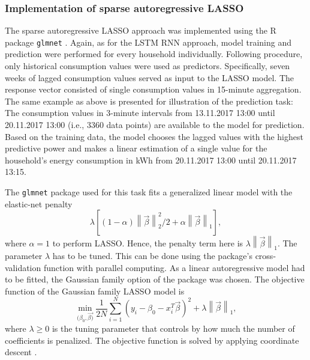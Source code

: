 \subsubsection{Implementation of sparse autoregressive LASSO}

The sparse autoregressive LASSO approach was implemented using the R package \texttt{glmnet} \citep{Friedman:2010}. Again, as for the LSTM RNN approach, model training and prediction were performed for every household individually. Following \cites{Li:2017} procedure, only historical consumption values were used as predictors. Specifically, seven weeks of lagged consumption values served as input to the LASSO model. The response vector consisted of single consumption values in 15-minute aggregation. The same example as above is presented for illustration of the prediction task: The consumption values in 3-minute intervals from 13.11.2017 13:00 until 20.11.2017 13:00 (i.e., 3360 data points) are available to the model for prediction. 
Based on the training data, the model chooses the lagged values with the highest predictive power and makes a linear estimation of a single value for the household's energy consumption in kWh from 20.11.2017 13:00 until 20.11.2017 13:15.

The \texttt{glmnet} package used for this task fits a generalized linear model with the  elastic-net penalty
%
\begin{equation} \label{Eq:elasticnetpenalty}
    \lambda\left[(1-\alpha)\left\lVert\vec{\beta}\right\rVert^2_2/2 + \alpha \left\lVert\vec{\beta}\right\rVert_1\right],
\end{equation}
%
where $\alpha=1$ to perform LASSO. Hence, the penalty term here is $\lambda\left\lVert\vec{\beta}\right\rVert_1$. The parameter $\lambda$ has to be tuned. This can be done using the package's cross-validation function with parallel computing. As a linear autoregressive model had to be fitted, the Gaussian family option of the package was chosen. The objective function of the Gaussian family LASSO model is
%
\begin{equation} \label{Eq:glmnetobjfun}
    \min_{(\beta_0, \vec{\beta)}}\frac{1}{2N} \sum_{i=1}^N (y_i -\beta_0-x_i^T\vec{\beta})^2+\lambda\left\lVert\vec{\beta}\right\rVert_1,
\end{equation}
%
where $\lambda \geq 0$ is the tuning parameter that controls by how much the number of coefficients is penalized. The objective function is solved by applying coordinate descent \citep[for more details see][]{Friedman:2010}.

